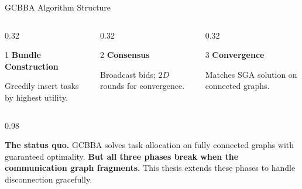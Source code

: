 \documentclass[aspectratio=169, 11pt]{beamer}
\newcommand{\subheader}[1]{{\rmfamily\bfseries\normalsize\color{TextPrimary} #1}}
\newcommand{\smallcap}[1]{{\rmfamily\small\color{TextSecondary} #1}}
\begin{document}
\begin{frame}{GCBBA Algorithm Structure}
  \vspace{-20pt}
  \begin{columns}[T]
    \begin{column}{0.32\textwidth}
      \begin{numcard}[before upper=\vspace{1.2em}, top=2pt, bottom=4pt]{1}
        \subheader{Bundle Construction}\par\vspace{1pt}
        \smallcap{Greedily insert tasks by highest utility.}
      \end{numcard}
    \end{column}
    \begin{column}{0.32\textwidth}
      \begin{numcard}[before upper=\vspace{1.2em}, top=2pt, bottom=4pt]{2}
        \subheader{Consensus}\par\vspace{1pt}
        \smallcap{Broadcast bids; $2D$ rounds for convergence.}
      \end{numcard}
    \end{column}
    \begin{column}{0.32\textwidth}
      \begin{numcard}[before upper=\vspace{1.2em}, top=2pt, bottom=4pt]{3}
        \subheader{Convergence}\par\vspace{1pt}
        \smallcap{Matches SGA solution on connected graphs.}
      \end{numcard}
    \end{column}
  \end{columns}

  \vspace{16pt}
  
  \begin{columns}[T]
    \begin{column}{0.98\textwidth}
      \begin{infobox}
        \textbf{The status quo.} GCBBA solves task allocation on fully connected graphs with guaranteed optimality. \textbf{But all three phases break when the communication graph fragments.} This thesis extends these phases to handle disconnection gracefully.
      \end{infobox}
    \end{column}
  \end{columns}
\end{frame}
\end{document}
